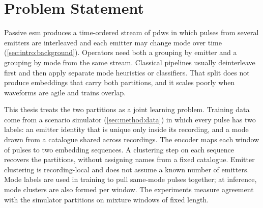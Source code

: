 \section{Problem Statement}\label{sec:intro:problem}

Passive \gls{esm} produces a time-ordered stream of \glspl{pdw} in which pulses from several emitters are interleaved and each emitter may change mode over time (\cref{sec:intro:background}).
Operators need both a grouping by emitter and a grouping by mode from the same stream.
Classical pipelines usually deinterleave first and then apply separate mode heuristics or classifiers.
That split does not produce embeddings that carry both partitions, and it scales poorly when waveforms are agile and trains overlap.

This thesis treats the two partitions as a joint learning problem.
Training data come from a scenario simulator (\cref{sec:method:data}) in which every pulse has two labels: an emitter identity that is unique only inside its recording, and a mode drawn from a catalogue shared across recordings.
The encoder maps each window of pulses to two embedding sequences.
A clustering step on each sequence recovers the partitions, without assigning names from a fixed catalogue.
Emitter clustering is recording-local and does not assume a known number of emitters.
Mode labels are used in training to pull same-mode pulses together; at inference, mode clusters are also formed per window.
The experiments measure agreement with the simulator partitions on mixture windows of fixed length.
